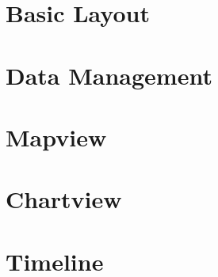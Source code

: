 \newpage
\section{Basic Layout}

\newpage
\section{Data Management}

\newpage
\section{Mapview}

\newpage
\section{Chartview}

\newpage
\section{Timeline}
%
%
%
%
%
